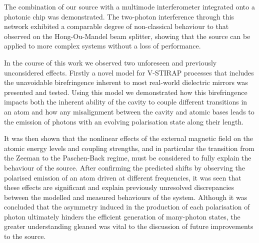 \documentclass[../Thesis-IJspeert.tex]{subfiles}
\begin{document}
The combination of our source with a multimode interferometer integrated onto a photonic chip was demonstrated.  The two-photon interference through this network exhibited a comparable degree of non-classical behaviour to that observed on the Hong-Ou-Mandel beam splitter, showing that the source can be applied to more complex systems without a loss of performance.

In the course of this work we observed two unforeseen and previously unconsidered effects.  Firstly a novel model for V-STIRAP processes that includes the unavoidable birefringence inherent to most real-world dielectric mirrors was presented and tested.  Using this model we demonstrated how this birefringence impacts both the inherent ability of the cavity to couple different transitions in an atom and how any misalignment between the cavity and atomic bases leads to the emission of photons with an evolving polarisation state along their length.

It was then shown that the nonlinear effects of the external magnetic field on the atomic energy levels and coupling strengths, and in particular the transition from the Zeeman to the Paschen-Back regime, must be considered to fully explain the behaviour of the source.  After confirming the predicted shifts by observing the polarised emission of an atom driven at different frequencies, it was seen that these effects are significant and explain previously unresolved discrepancies between the modelled and measured behaviours of the system.  Although it was concluded that the asymmetry induced in the production of each polarisation of photon ultimately hinders the efficient generation of many-photon states, the greater understanding gleaned was vital to the discussion of future improvements to the source.
\end{document}
